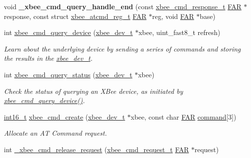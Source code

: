 \begin{DoxyCompactItemize}
\item 
\hypertarget{group__xbee__atcmd_gafdbf73f2f7ab0efaa371e912f36ac8cb}{void {\bfseries \-\_\-xbee\-\_\-cmd\-\_\-query\-\_\-handle\-\_\-end} (const \hyperlink{structxbee__cmd__response__t}{xbee\-\_\-cmd\-\_\-response\-\_\-t} \hyperlink{group__hal_gaef060b3456fdcc093a7210a762d5f2ed}{F\-A\-R} $\ast$response, const struct \hyperlink{structxbee__atcmd__reg__t}{xbee\-\_\-atcmd\-\_\-reg\-\_\-t} \hyperlink{group__hal_gaef060b3456fdcc093a7210a762d5f2ed}{F\-A\-R} $\ast$reg, void \hyperlink{group__hal_gaef060b3456fdcc093a7210a762d5f2ed}{F\-A\-R} $\ast$base)}\label{group__xbee__atcmd_gafdbf73f2f7ab0efaa371e912f36ac8cb}

\item 
int \hyperlink{group__xbee__atcmd_ga12317255ca84c2539b7d7a58816eccab}{xbee\-\_\-cmd\-\_\-query\-\_\-device} (\hyperlink{structxbee__dev__t}{xbee\-\_\-dev\-\_\-t} $\ast$xbee, uint\-\_\-fast8\-\_\-t refresh)
\begin{DoxyCompactList}\small\item\em Learn about the underlying device by sending a series of commands and storing the results in the \hyperlink{structxbee__dev__t}{xbee\-\_\-dev\-\_\-t}. \end{DoxyCompactList}\item 
int \hyperlink{group__xbee__atcmd_ga83f36dfc3c3cd2c4046719ea6e9cc53c}{xbee\-\_\-cmd\-\_\-query\-\_\-status} (\hyperlink{structxbee__dev__t}{xbee\-\_\-dev\-\_\-t} $\ast$xbee)
\begin{DoxyCompactList}\small\item\em Check the status of querying an X\-Bee device, as initiated by \hyperlink{group__xbee__atcmd_ga12317255ca84c2539b7d7a58816eccab}{xbee\-\_\-cmd\-\_\-query\-\_\-device()}. \end{DoxyCompactList}\item 
\hyperlink{group__hal_ga2140805d08462d474b82ddc8d1c2f3e6}{int16\-\_\-t} \hyperlink{group__xbee__atcmd_gab73aaf873be6f9e515dcd65748a7f21c}{xbee\-\_\-cmd\-\_\-create} (\hyperlink{structxbee__dev__t}{xbee\-\_\-dev\-\_\-t} $\ast$xbee, const char \hyperlink{group__hal_gaef060b3456fdcc093a7210a762d5f2ed}{F\-A\-R} \hyperlink{group__xbee__atcmd_ga1a5aaa930940857f68f245eeb89506b5}{command}\mbox{[}3\mbox{]})
\begin{DoxyCompactList}\small\item\em Allocate an A\-T Command request. \end{DoxyCompactList}\item 
int \hyperlink{group__xbee__atcmd_ga899d5ef84ca5790c3c76b965f88874e0}{\-\_\-xbee\-\_\-cmd\-\_\-release\-\_\-request} (\hyperlink{structxbee__cmd__request__t}{xbee\-\_\-cmd\-\_\-request\-\_\-t} \hyperlink{group__hal_gaef060b3456fdcc093a7210a762d5f2ed}{F\-A\-R} $\ast$request)

\end{DoxyCompactItemize}
